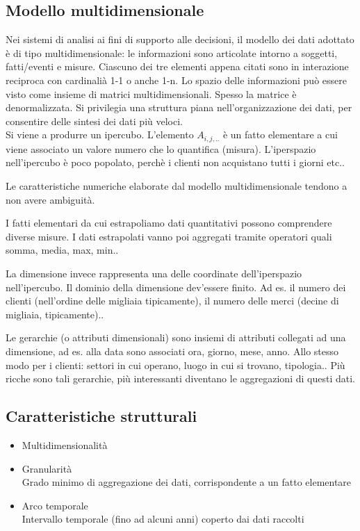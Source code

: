 \subsection{Modello multidimensionale}
\label{sub:Modello multidimensionale}
Nei sistemi di analisi ai fini di supporto alle decisioni, il modello dei dati adottato
\`e di tipo multidimensionale: le informazioni sono articolate intorno a soggetti, fatti/eventi e misure.
Ciascuno dei tre elementi appena citati sono in interazione reciproca con cardinali\`a 1-1 o anche 1-n.
Lo spazio delle informazioni pu\`o essere visto come insieme di matrici multidimensionali.
Spesso la matrice \`e denormalizzata. Si privilegia una struttura piana nell'organizzazione dei dati,
per consentire delle sintesi dei dati pi\`u veloci.\\
Si viene a produrre un ipercubo. L'elemento $A_{i,j,..}$ \`e un fatto elementare a cui viene associato un valore
numero che lo quantifica (misura).
L'iperspazio nell'ipercubo \`e poco popolato, perch\`e i clienti non acquistano tutti i giorni etc..

Le caratteristiche numeriche elaborate dal modello multidimensionale
tendono a non avere ambiguit\`a.

I fatti elementari da cui estrapoliamo dati quantitativi possono
comprendere diverse misure. I dati estrapolati vanno poi aggregati
tramite operatori quali somma, media, max, min..

La dimensione invece rappresenta una delle coordinate dell'iperspazio
nell'ipercubo. Il dominio della dimensione dev'essere finito. Ad es. il
numero dei clienti (nell'ordine delle migliaia tipicamente), il numero
delle merci (decine di migliaia, tipicamente)..

Le gerarchie (o attributi dimensionali) sono insiemi di attributi
collegati ad una dimensione, ad es. alla data sono associati ora,
giorno, mese, anno. Allo stesso modo per i clienti: settori in cui
operano, luogo in cui si trovano, tipologia.. Pi\`u ricche sono tali
gerarchie, pi\`u interessanti diventano le aggregazioni di questi dati.

\subsection{Caratteristiche
strutturali}\label{caratteristiche-strutturali}

\begin{itemize}

\item
  Multidimensionalit\`a
\item
  Granularit\`a\\
  Grado minimo di aggregazione dei dati, corrispondente a un fatto
  elementare
\item
  Arco temporale\\
  Intervallo temporale (fino ad alcuni anni) coperto dai dati raccolti
\end{itemize}

